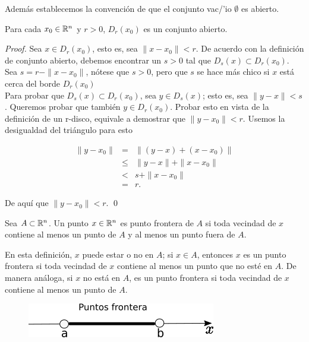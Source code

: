 Además establecemos la convención de que el conjunto vac/'io $\emptyset$ es abierto.

\begin{theorem}
    Para cada $x_{0} \in \mathbb{R}^{n}$ y $r > 0$, $D_{r}(x_{0})$ es un conjunto abierto.
\end{theorem}

\begin{proof}
    Sea $x \in D_{r}(x_{0})$, esto es, sea $\|x - x_{0}\| < r$. De acuerdo con la definición
    de conjunto abierto, debemos encontrar un $s > 0$ tal que $D_{s}(x) \subset  D_{r}(x_{0})$.
    Sea $s = r - \|x - x_{0}\|$, nótese que $s > 0$, pero que $s$ se hace más chico si $x$ está
    cerca del borde $D_{r}(x_{0})$ \\

    Para probar que $D_{s}(x) \subset D_{r}(x_{0})$, sea $y \in D_{s}(x)$; esto es, sea
    $\|y - x\| < s$. Queremos probar que también $y \in D_{r}(x_{0})$. Probar esto en vista
    de la definición de un r-disco, equivale a demostrar que $\|y -x_{0}\| < r$. Usemos la desigualdad
    del triángulo para esto

    \begin{eqnarray*}
        \|y - x_{0}\| &=& \|(y - x) + (x - x_{0})\| \\
                              &\le& \|y - x\| + \|x - x_{0}\| \\
                              &<& s + \|x-x_{0}\| \\
                              &=& r \text{.}
    \end{eqnarray*}

    De aquí que $\|y - x_{0}\| < r$. \qed

\end{proof}

\begin{definition}
    Sea $A \subset \mathbb{R}^{n}$. Un punto $x \in \mathbb{R}^{n}$ es punto frontera de $A$ si toda vecindad de $x$ contiene al menos un punto de $A$ y al menos un punto fuera de $A$.
\end{definition}

En esta definición, $x$ puede estar o no en $A$; si $x \in A$, entonces $x$ es un punto frontera si toda vecindad de $x$ contiene al menos un punto
que no esté en $A$. De manera análoga, si $x$ no está en $A$, es un punto frontera si toda vecindad de
$x$ contiene al menos un punto de $A$.

\begin{figure}[!ht]
  \begin{center}
      \includegraphics[width=0.5\linewidth]{gfx/puntos-frontera}
      \caption{}
      \label{fig:boat1}
  \end{center}
\end{figure}


